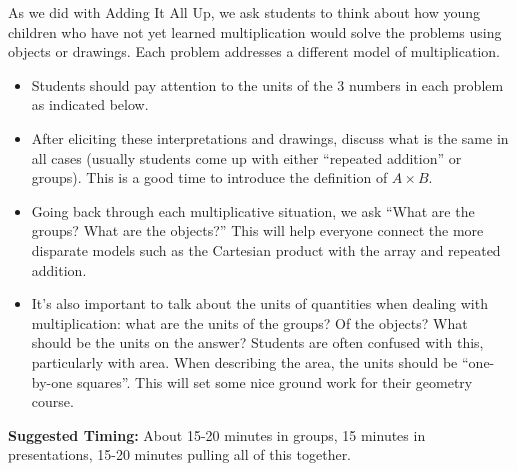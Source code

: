 \documentclass{ximera}
\begin{document}
\newpage
\begin{instructorNotes}
As we did with Adding It All Up, we ask students to think about how young children who have not yet learned multiplication would solve the problems using objects or drawings.  Each problem addresses a different model of multiplication. 

\begin{itemize}
	\item Students should pay attention to the units of the 3 numbers in each problem as indicated below.
	\item After eliciting these interpretations and drawings, discuss what is the same in all cases (usually students come up with either ``repeated addition'' or groups).  This is a good time to introduce the definition of $A\times B$.  
	\item Going back through each multiplicative situation, we ask ``What are the groups? What are the objects?''  This will help everyone connect the more disparate models such as the Cartesian product with the array and repeated addition.  
	\item It's also important to talk about the units of quantities when dealing with multiplication: what are the units of the groups?  Of the objects?  What should be the units on the answer?  Students are often confused with this, particularly with area.  When describing the area, the units should be ``one-by-one squares''.  This will set some nice ground work for their geometry course.
\end{itemize}




{\bf Suggested Timing:} About 15-20 minutes in groups, 15 minutes in presentations, 15-20 minutes pulling all of this together.
\end{instructorNotes}
\end{document}
